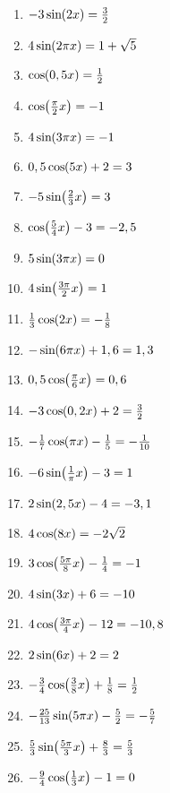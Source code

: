 \documentclass[a4paper,12pt, headsepline, ngerman]{scrartcl}
\theoremstyle{definition}
\newcommand{\sinn}[1]{\sin\hspace{-2pt}\left(#1\right)}
\newcommand{\coss}[1]{\cos\hspace{-2pt}\left(#1\right)}
\begin{document}
\begin{Exercise}[title={\raggedright\normalfont Bestimme jeweils alle Lösungen:}, label=sincosGleichungenAllgA1]
\begin{enumerate}[label=\alph*)]
	\item \(-3\sinn{2x}=\frac{3}{2}\)
	\item \(4\sinn{2\pi x}=1+\sqrt{5}\)
	\item \(\coss{0,5x}=\frac{1}{2}\)
	\item \(\coss{\frac{\pi}{2}x}=-1\)
	\item \(4\sinn{3\pi x}=-1\)
	\item \(0,5\coss{5x}+2=3\)
	\item \(-5\sinn{\frac{2}{3}x}=3\)
	\item \(\coss{\frac{5}{4}x}-3=-2,5\)
	\item \(5\sinn{3\pi x}=0\)
	\item \(4\sinn{\frac{3\pi}{2}x}=1\)
	\item \(\frac{1}{3}\coss{2x}=-\frac{1}{8}\)
	\item \(-\sinn{6\pi x}+1,6=1,3\)
	\item \(0,5\coss{\frac{\pi}{6}x}=0,6\)
	\item \(-3\coss{0,2x}+2=\frac{3}{2}\)
	\item \(-\frac{1}{7}\coss{\pi x}-\frac{1}{5}=-\frac{1}{10}\)
	\item \(-6\sinn{\frac{1}{\pi}x}-3=1\)
	\item \(2\sinn{2,5x}-4=-3,1\)
	\item \(4\coss{8x}=-2\sqrt{2}\)
	\item \(3\coss{\frac{5\pi}{8}x}-\frac{1}{4}=-1\)
	\item \(4\sinn{3x}+6=-10\)
	\item \(4\coss{\frac{3\pi}{4}x}-12=-10,8\)
	\item \(2\sinn{6x}+2=2\)
	\item \(-\frac{3}{4}\coss{\frac{3}{8}x}+\frac{1}{8}=\frac{1}{2}\)
	\item \(-\frac{25}{13}\sinn{5\pi x}-\frac{5}{2}=-\frac{5}{7}\)
	\item \(\frac{5}{3}\sinn{\frac{5\pi}{3}x}+\frac{8}{3}=\frac{5}{3}\)
	\item \(-\frac{9}{4}\coss{\frac{1}{3}x}-1=0\)
\end{enumerate}
\end{Exercise}
\end{document}
